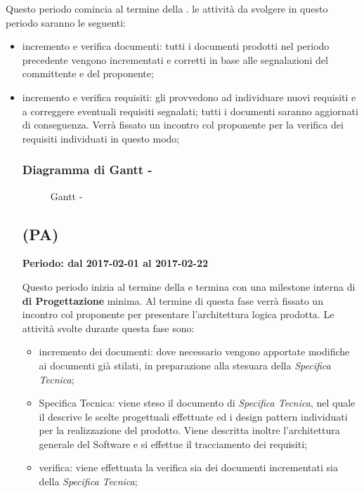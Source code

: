 \documentclass[./PianoDiProgetto.tex]{subfiles}
\begin{document}
  Questo periodo comincia al termine della \PerAR.  le attività da svolgere in questo periodo saranno le seguenti:
  \begin{itemize}
    \item incremento e verifica documenti: tutti i documenti prodotti nel periodo precedente vengono incrementati e corretti in base alle segnalazioni del committente e del proponente;
    \item incremento e verifica requisiti:  gli \ANP provvedono ad individuare nuovi requisiti e a correggere eventuali requisiti segnalati; tutti i documenti saranno aggiornati di conseguenza. Verrà fissato un incontro col proponente per la verifica dei requisiti individuati in questo modo;
  \subsubsection{Diagramma di Gantt - \PerAD}
    \begin{figure}[!h]
    \centering
    \caption{Gantt - \PerAD}
    \end{figure}

  \subsection{\PerPA{} (PA)}
  \textbf{Periodo: dal 2017-02-01 al 2017-02-22}

  Questo periodo inizia al termine della \PerAD{} e termina con una milestone interna di \textbf{\label{Revisione} di Progettazione} minima. Al termine di questa fase verrà fissato un incontro col proponente per presentare l'architettura logica prodotta. Le attività svolte durante questa fase sono:
  \begin{itemize}
    \item incremento dei documenti: dove necessario vengono apportate modifiche ai documenti già stilati, in preparazione alla stesuara della \textit{Specifica Tecnica};
    \item Specifica Tecnica: viene steso il documento di \textit{Specifica Tecnica}, nel quale il \PJ{} descrive le scelte progettuali effettuate ed i design pattern individuati per la realizzazione del prodotto. Viene descritta inoltre l'architettura generale del Software e si effettue il tracciamento dei requisiti;
    \item verifica: viene effettuata la verifica sia dei documenti incrementati sia della \textit{Specifica Tecnica};
  \end{itemize}

  \end{itemize}
\end{document}
